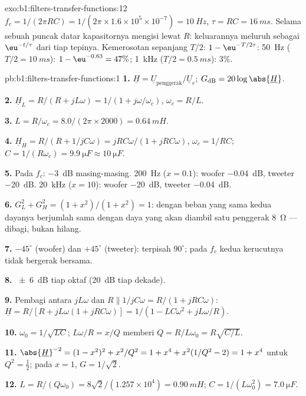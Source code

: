 \begin{solution}{exo:b1:filters-transfer-functions:12}
$f_c = 1/(2\pi RC) = 1/(2\pi \times 1.6\times10^5 \times 10^{-7}) =
\qty{10}{Hz}$, $\tau = RC = \qty{16}{ms}$. Selama sebuah puncak datar
kapasitornya mengisi lewat $R$: keluarannya meluruh sebagai $\eu^{-t/\tau}$
dari tiap tepinya. Kemerosotan sepanjang $T/2$: $1 - \eu^{-T/2\tau}$: \qty{50}{Hz}
($T/2 = \qty{10}{ms}$): $1 - \eu^{-0.63} = 47\%$; \qty{1}{kHz}
($T/2 = \qty{0.5}{ms}$): $3\%$.
\end{solution}

\begin{solution}{pb:b1:filters-transfer-functions:1}
\textbf{1.} $\underline H = \underline U_{\text{penggerak}}/\underline U_e$;
$G_{\mathrm{dB}} = 20\log\abs{\underline H}$.

\textbf{2.} $\underline H_L = R/(R + jL\omega) = 1/(1 + j\omega/\omega_c)$,
$\omega_c = R/L$.

\textbf{3.} $L = R/\omega_c = 8.0/(2\pi \times 2000) = \qty{0.64}{mH}$.

\textbf{4.} $\underline H_H = R/(R + 1/jC\omega) = jRC\omega/(1 + jRC\omega)$,
$\omega_c = 1/RC$; $C = 1/(R\omega_c) = \qty{9.9}{\micro F} \approx
\qty{10}{\micro F}$.

\textbf{5.} Pada $f_c$: \qty{-3}{dB} masing-masing. \qty{200}{Hz} ($x = 0.1$): woofer
\qty{-0.04}{dB}, tweeter \qty{-20}{dB}. \qty{20}{kHz} ($x = 10$): woofer
\qty{-20}{dB}, tweeter \qty{-0.04}{dB}.

\textbf{6.} $G_L^2 + G_H^2 = (1 + x^2)/(1 + x^2) = 1$: dengan beban yang
sama kedua dayanya berjumlah sama dengan daya yang akan diambil satu
penggerak \qty{8}{\ohm} --- dibagi, bukan hilang.

\textbf{7.} $-45^\circ$ (woofer) dan $+45^\circ$ (tweeter): terpisah
$90^\circ$; pada $f_c$ kedua kerucutnya tidak bergerak bersama.

\textbf{8.} \qty{\pm 6}{dB} tiap oktaf (\qty{20}{dB} tiap dekade).

\textbf{9.} Pembagi antara $jL\omega$ dan $R \parallel 1/jC\omega =
R/(1 + jRC\omega)$: $\underline H = R/[R + jL\omega(1 + jRC\omega)] =
1/(1 - LC\omega^2 + jL\omega/R)$.

\textbf{10.} $\omega_0 = 1/\sqrt{LC}$; $L\omega/R = x/Q$ memberi $Q =
R/L\omega_0 = R\sqrt{C/L}$.

\textbf{11.} $\abs{\underline H}^{-2} = (1 - x^2)^2 + x^2/Q^2 = 1 + x^4 +
x^2(1/Q^2 - 2) = 1 + x^4$ untuk $Q^2 = \tfrac12$; pada $x = 1$, $G = 1/\sqrt2$.

\textbf{12.} $L = R/(Q\omega_0) = 8\sqrt2/(1.257\times10^4) = \qty{0.90}{mH}$;
$C = 1/(L\omega_0^2) = \qty{7.0}{\micro F}$.


\end{solution}
